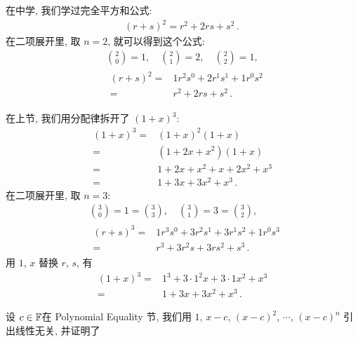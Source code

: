 \begin{example}
    在中学, 我们学过完全平方和公式:
    \begin{align*}
        (r + s)^2 = r^2 + 2rs + s^2 \period
    \end{align*}
    在二项展开里, 取 $n = 2$, 就可以得到这个公式:
    \begin{align*}
         & \binom{2}{0} = 1, \quad \binom{2}{1} = 2, \quad \binom{2}{2} = 1, \\
         & \begin{aligned}
            (r + s)^2
            = {} & 1r^2 s^0 + 2r^1 s^1 + 1r^0 s^2 \\
            = {} & r^2 + 2rs + s^2 \period
        \end{aligned}
    \end{align*}

    在上节, 我们用分配律拆开了 $(1+x)^3$:
    \begin{align*}
        (1+x)^3
        = {} & (1+x)^2 (1+x)         \\
        = {} & (1+2x+x^2) (1+x)      \\
        = {} & 1+2x+x^2 + x+2x^2+x^3 \\
        = {} & 1+3x+3x^2+x^3 \period
    \end{align*}
    在二项展开里, 取 $n = 3$:
    \begin{align*}
         & \binom{3}{0} = 1 = \binom{3}{3}, \quad \binom{3}{1} = 3 = \binom{3}{2}, \\
         & \begin{aligned}
            (r+s)^3
            = {} & 1r^3 s^0 + 3r^2 s^1 + 3r^1 s^2 + 1r^0 s^3 \\
            = {} & r^3 + 3r^2 s + 3r s^2 + s^3 \period
        \end{aligned}
    \end{align*}
    用 $1$, $x$ 替换 $r$, $s$, 有
    \begin{align*}
        (1+x)^3
        = {} & 1^3 + 3 \cdot 1^2 x + 3 \cdot 1 x^2 + x^3 \\
        = {} & 1 + 3x + 3x^2 + x^3 \period
    \end{align*}
\end{example}

设 $c \in \mathbb{F}$\period 在 Polynomial Equality 节, 我们用 $1$, $x-c$, $(x-c)^2$, $\cdots$, $(x-c)^n$ 引出线性无关, 并证明了


